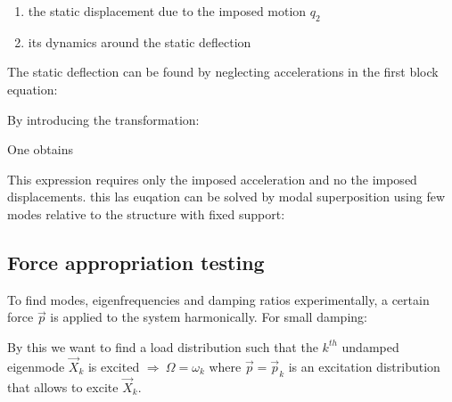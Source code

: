 \documentclass[10pt,a4paper]{scrartcl}
\begin{document}
\begin{multicols*}{2}
\begin{enumerate}
\item the static displacement due to the imposed motion $q_2$
\item its dynamics around the static deflection
\end{enumerate}


The static deflection can be found by neglecting accelerations in the first block equation:


By introducing the transformation:


One obtains


This expression requires only the imposed acceleration and no the imposed displacements. this las euqation can be solved by modal superposition using few modes relative to the structure with fixed support:


\subsection{Force appropriation testing}

To find modes, eigenfrequencies and damping ratios experimentally, a certain force $\vec{p}$  is applied to the system harmonically. For small damping:


By this we want to find a load distribution such that the $k^{th}$ undamped eigenmode $\vec{X}_k$ is excited $\Longrightarrow\ \Omega=\omega_k$ where $\vec{p}=\vec{p}_k$ is an excitation distribution that allows to excite $\vec{X}_k$.


\end{multicols*}
\end{document}
